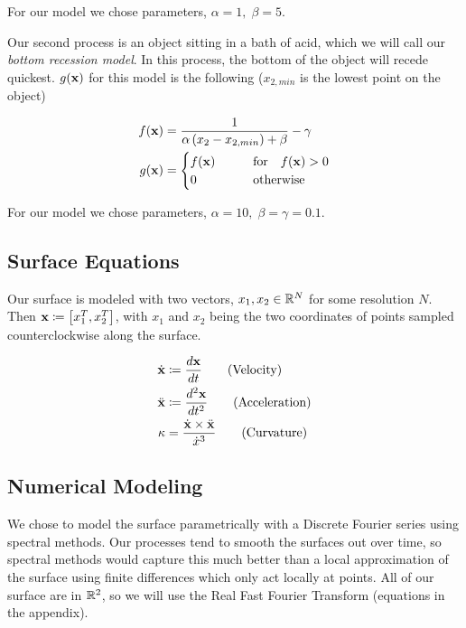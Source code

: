 For our model we chose parameters, $\alpha = 1, \; \beta = 5$.

Our second process is an object sitting in a bath of acid, which we will call our \textit{bottom recession model}. In this process, the bottom of the object will recede quickest. $g(\mathbf{x})$ for this model is the following ($x_{2, min}$ is the lowest point on the object)

\begin{align}
  f(\mathbf{x})& = \frac{1}{\alpha \, (x_2 - x_{2, min}) + \beta} - \gamma\\
  g(\mathbf{x})& = \begin{cases}
    f(\mathbf{x}) \qquad &\text{for} \quad f(\mathbf{x}) > 0\\
    0 \qquad &\text{otherwise}
  \end{cases}
\end{align}

For our model we chose parameters, $\alpha = 10, \; \beta = \gamma = 0.1$.

\subsection*{Surface Equations}

Our surface is modeled with two vectors, $x_1, x_2 \in \mathbb R^N$ for some resolution $N$. Then $\bvec{x} \coloneqq \bracket{x_1^T, x_2^T}$, with $x_1$ and $x_2$ being the two coordinates of points sampled counterclockwise along the surface.

\begin{align}
  \dot{\mathbf{x}}& \coloneqq \frac{d\mathbf{x}}{dt} \tag{Velocity}\\
  \ddot{\mathbf{x}}& \coloneqq \frac{d^2\mathbf{x}}{dt^2} \tag{Acceleration}\\
  \kappa& = \frac{\dot{\mathbf{x}} \times \ddot{\mathbf{x}}}{\dot{x}^3} \tag{Curvature}
\end{align}

\subsection*{Numerical Modeling}

We chose to model the surface parametrically with a Discrete Fourier series using spectral methods. Our processes tend to smooth the surfaces out over time, so spectral methods would capture this much better than a local approximation of the surface using finite differences which only act locally at points. All of our surface are in $\mathbb R^2$, so we will use the Real Fast Fourier Transform (equations in the appendix).

